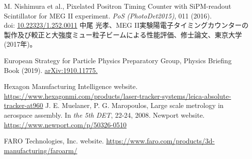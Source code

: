 \documentclass[report]{jsbook}
\begin{document}
\begin{thebibliography}{99}
 M. Nishimura et al., Pixelated Positron Timing Counter with SiPM-readout Scintillator for MEG II experiment. {\it PoS (PhotoDet2015)}, 011 (2016). \\
doi: \href{https://doi.org/10.22323/1.252.0011}{10.22323/1.252.0011}
 中尾 光孝、MEG II実験陽電子タイミングカウンターの製作及び較正と大強度ミュー粒子ビームによる性能評価、修士論文、東京大学 (2017年)。

 European Strategy for Particle Physics Preparatory Group, Physics Briefing Book (2019). \href{http://arxiv.org/abs/1910.11775}{arXiv:1910.11775.} 

 Hexagon Manufacturing Intelligence website. \url{https://www.hexagonmi.com/products/laser-tracker-systems/leica-absolute-tracker-at960}
 J. E. Muelaner, P. G. Maropoulos, Large scale metrology in aerospace assembly. In {\it the 5th DET}, 22-24, 2008.
 Newport website. \url{https://www.newport.com/p/50326-0510}

 FARO Technologies, Inc. website. \url{https://www.faro.com/products/3d-manufacturing/faroarm/}
\end{thebibliography}


\begin{comment}

・図の挿入の仕方
\begin{figure}[h]
\begin{center}
\texttt{[image: ./plot1.pdf]}
\caption{サイン関数のグラフ}
\end{center}
\end{figure}


\begin{verbatim}
#include <iostream>
using namespace std;
int main() {
for(int i = 1; i <= 5; i++) {
cout << "こんにちは" << i << endl;
}
return 0;
}
\end{verbatim}
\verb|\usepackage{ascmac}|して\verb|screen| 環境を使うと，枠がつきます。
\begin{screen}
\begin{verbatim}
#include <iostream>
using namespace std;
int main() {
for(int i = 1; i <= 5; i++) {
cout << "こんにちは" << i << endl;
}
return 0;
}
\end{verbatim}
\end{screen}

\end{comment}
\end{document}
